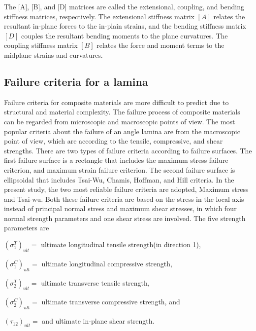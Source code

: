 The [A], [B], and [D] matrices are called the extensional, coupling, and bending stiffness matrices,
respectively. The extensional stiffness matrix $[A]$ relates the resultant in-plane forces to the
in-plain strains, and the bending stiffness matrix $[D]$ couples the resultant bending moments to
the plane curvatures.  The coupling stiffness matrix $[B]$ relates the force and moment terms to the
midplane strains and curvatures.

\subsection{Failure criteria for a lamina}

Failure criteria for composite materials are more difficult to predict due to
structural and material complexity. The failure process of composite materials
can be regarded from microscopic and macroscopic points of view. The most
popular criteria about the failure of an angle lamina are from the macroscopic
point of view, which are according to the tensile, compressive, and shear
strengths. There are two types of failure
criteria\cite{massard1984computer,reddy1987first,fang1993design,soeiro1994multilevel,pelletier2006multi,jadhav2007parametric,omkar2008artificial,choudhury2019failure}
according to failure surfaces. The first failure surface is a rectangle that
includes the maximum stress failure criterion\cite{watkins1987multicriteria},
and maximum strain failure criterion. The second failure surface is ellipsoidal
that includes Tsai-Wu\cite{martin1987optimum,soares1995discrete}, Chamis,
Hoffman, and Hill criteria. In the present study, the two most reliable failure
criteria are adopted, Maximum stress and Tsai-wu. Both these failure criteria
are based on the stress in the local axis instead of principal normal stress and
maximum shear stresses, in which four normal strength parameters and one shear
stress are involved. The five strength parameters are

$(\sigma _1^{T})_{ult}= $ ultimate longitudinal tensile strength(in direction 1),

$(\sigma _1^{C})_{ult}= $ ultimate longitudinal compressive strength,

$(\sigma _2^{T})_{ult}= $ ultimate transverse tensile strength,

$(\sigma _2^{C})_{ult}= $ ultimate transverse compressive strength, and

$(\tau_{12})_{ult}= $ and ultimate in-plane shear strength.

